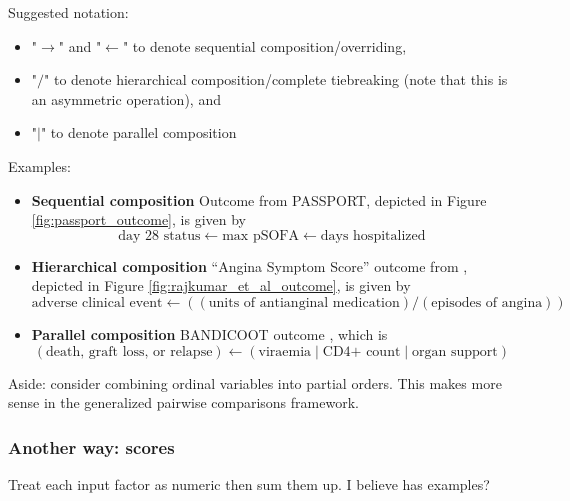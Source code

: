\documentclass[
  11pt,
  fleqn
]{article}
\begin{document}
Suggested notation:
\begin{itemize}
  \item "$\rightarrow$" and "$\leftarrow$" to denote sequential
    composition/overriding,
  \item "$/$" to denote hierarchical composition/complete tiebreaking
    (note that this is an asymmetric operation), and
  \item "$|$" to denote parallel composition
\end{itemize}

Examples:

\begin{itemize}
  \item \textbf{Sequential composition} Outcome from PASSPORT,
    depicted in Figure
    \ref{fig:passport_outcome}, is given by
    \[ \text{day 28 status} \leftarrow \text{max pSOFA} \leftarrow \text{days
      hospitalized}
    \]
  \item
    \textbf{Hierarchical composition} ``Angina Symptom Score'' outcome from
    \citet{rajkumarPlaceboControlledTrialPercutaneous2023}, depicted in Figure
    \ref{fig:rajkumar_et_al_outcome}, is given by \[
      \text{adverse clinical event} \leftarrow ((\text{units of
    antianginal medication}) / (\text{episodes of angina})) \]

  \item \textbf{Parallel composition} BANDICOOT outcome
    \citep{walkerCodesigningNovelOrdinal2025}, which is
    \[
      (\text{death, graft loss, or relapse}) \leftarrow (\text{viraemia} \;|\;
      \text{CD4+ count} \;|\; \text{organ support})
    \]
\end{itemize}

Aside: \citet{wittkowskiCombiningSeveralOrdinal2004} consider combining
ordinal variables into partial orders. This makes more sense in the
generalized pairwise comparisons framework.

\subsubsection{Another way: scores}

Treat each input factor as
numeric then sum them up. I believe \citet{ongUnlockingDOORHow2023}
has examples?
\end{document}
